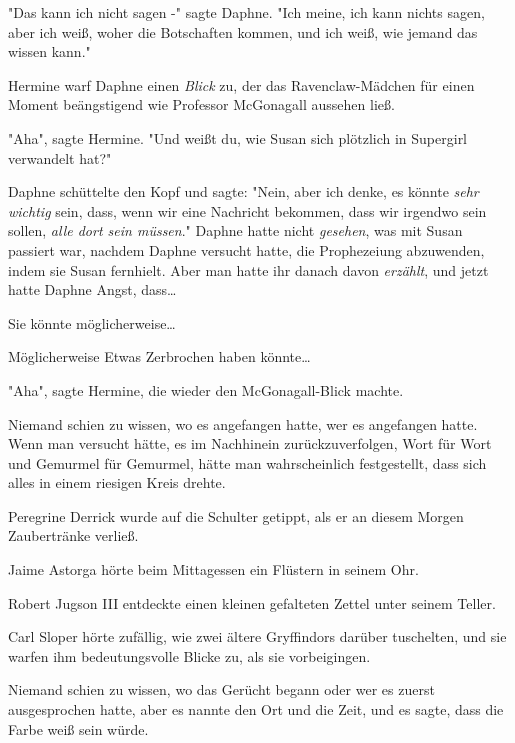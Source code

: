 {"Das kann ich nicht sagen -" sagte Daphne. "Ich meine, ich kann nichts sagen, aber ich weiß, woher die Botschaften kommen, und ich weiß, wie jemand das wissen kann."

Hermine warf Daphne einen \emph{Blick} zu, der das Ravenclaw-Mädchen für einen Moment beängstigend wie Professor McGonagall aussehen ließ.

"Aha", sagte Hermine. "Und weißt du, wie Susan sich plötzlich in Supergirl verwandelt hat?"

Daphne schüttelte den Kopf und sagte: "Nein, aber ich denke, es könnte \emph{sehr wichtig} sein, dass, wenn wir eine Nachricht bekommen, dass wir irgendwo sein sollen, \emph{alle dort sein müssen}." Daphne hatte nicht \emph{gesehen}, was mit Susan passiert war, nachdem Daphne versucht hatte, die Prophezeiung abzuwenden, indem sie Susan fernhielt. Aber man hatte ihr danach davon \emph{erzählt}, und jetzt hatte Daphne Angst, dass…

Sie könnte möglicherweise…

Möglicherweise Etwas Zerbrochen haben könnte…

"Aha", sagte Hermine, die wieder den McGonagall-Blick machte.

Niemand schien zu wissen, wo es angefangen hatte, wer es angefangen hatte. Wenn man versucht hätte, es im Nachhinein zurückzuverfolgen, Wort für Wort und Gemurmel für Gemurmel, hätte man wahrscheinlich festgestellt, dass sich alles in einem riesigen Kreis drehte.

Peregrine Derrick wurde auf die Schulter getippt, als er an diesem Morgen Zaubertränke verließ.

Jaime Astorga hörte beim Mittagessen ein Flüstern in seinem Ohr.

Robert Jugson III entdeckte einen kleinen gefalteten Zettel unter seinem Teller.

Carl Sloper hörte zufällig, wie zwei ältere Gryffindors darüber tuschelten, und sie warfen ihm bedeutungsvolle Blicke zu, als sie vorbeigingen.

Niemand schien zu wissen, wo das Gerücht begann oder wer es zuerst ausgesprochen hatte, aber es nannte den Ort und die Zeit, und es sagte, dass die Farbe weiß sein würde.

}
